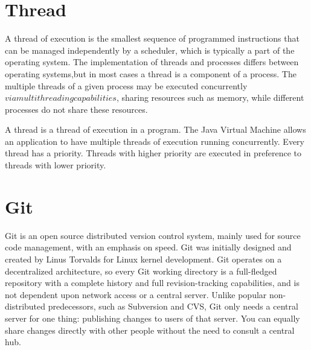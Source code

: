     \noindent


    \section{Thread}\label{sec:thread}
    A thread of execution is the smallest sequence of programmed instructions that can be managed
    independently by a scheduler, which is typically a part of the operating system.
    The implementation of threads and processes differs between operating systems,but in most cases
    a thread is a component  of a process.
    The multiple threads of a given process may be executed concurrently
    \(via multithreading capabilities\), sharing resources such as memory, while different
    processes do not share these resources.
    \medskip

	\noindent
    A thread is a thread of execution in a program.
    The Java Virtual Machine allows an application to have multiple threads of execution running
    concurrently.
    Every thread has a priority.
    Threads with higher priority are executed in preference to threads with lower priority.

    \section{Git}\label{sec:git}
    Git is an open source distributed version control system, mainly used for source code
    management, with an emphasis on speed.
    Git was initially designed and created by Linus Torvalds for Linux kernel development.
    Git operates on a decentralized architecture, so every Git working directory is a
    full-fledged repository with a complete history and full revision-tracking capabilities,
    and is not dependent upon network access or a central server.
    Unlike popular non-distributed predecessors, such as Subversion and CVS, Git only needs a
    central server for one thing: publishing changes to users of that server.
    You can equally share changes directly with other people without the need to consult a central hub.

